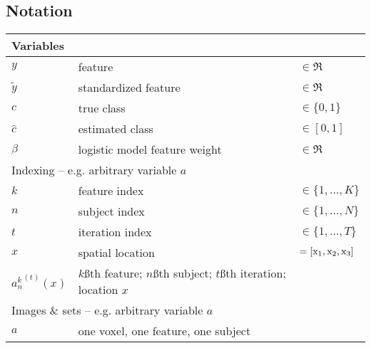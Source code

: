 \begin{singlespacing}
\subsection*{Notation}
\begin{table}[H]
  \begin{tabular}{lll}
  	\hline
  	\multicolumn{3}{l}{Variables}                                                                                            \\ \hline
  	$y$                   & feature                                                                    & $\in\Re$            \\
  	$\tilde{y}$           & standardized feature                                                       & $\in\Re$            \\
  	$c$                   & true class                                                                 & $\in\{0,1\}$        \\
  	$\hat{c}$             & estimated class                                                            & $\in[0,1]$          \\
  	$\beta$               & logistic model feature weight                                              & $\in\Re$            \\ \hline
  	\multicolumn{3}{l}{Indexing -- e.g. arbitrary variable $a$}                                                              \\ \hline
  	$k$                   & feature index                                                              & $\in \{1,\dots,K\}$ \\
  	$n$                   & subject index                                                              & $\in \{1,\dots,N\}$ \\
    $t$                   & iteration index                                                            & $\in \{1,\dots,T\}$ \\
  	$x$                   & spatial location                                                           & $= [\mathrm{x}_1,\mathrm{x}_2,\mathrm{x}_3]$          \\
  	${a_n^k}^{(t)}(x)$    & $k$\ss{th} feature; $n$\ss{th} subject; $t$\ss{th} iteration; location $x$ &                     \\ \hline
  	\multicolumn{3}{l}{Images \& sets -- e.g. arbitrary variable $a$}                                                        \\ \hline
  	$a$                   & one voxel, one feature, one subject                                        &                     \\

\end{tabular}
\end{table}
\end{singlespacing}
